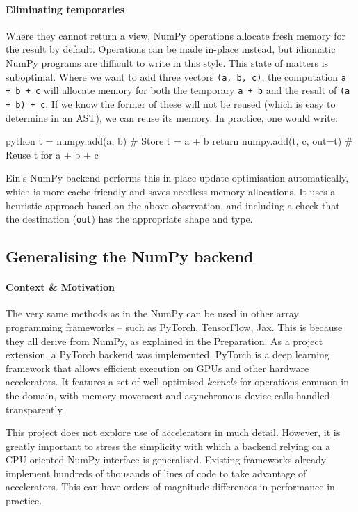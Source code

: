 \paragraph{Eliminating temporaries} Where they cannot return a view, NumPy operations allocate fresh memory for the result by default. Operations can be made in-place instead, but idiomatic NumPy programs are difficult to write in this style. 
This state of matters is suboptimal. Where we want to add three vectors \texttt{(a, b, c)}, the computation \texttt{a + b + c} will allocate memory for both the temporary \texttt{a + b} and the result of \texttt{(a + b) + c}. If we know the former of these will not be reused (which is easy to determine in an AST), we can reuse its memory. In practice, one would write:
\begin{center}
\begin{cminted}{python}
t = numpy.add(a, b)            # Store t = a + b
return numpy.add(t, c, out=t)  # Reuse t for a + b + c
\end{cminted}
\end{center}
Ein's NumPy backend performs this in-place update optimisation automatically, which is more cache-friendly and saves needless memory allocations. It uses a heuristic approach based on the above observation, and including a check that the destination (\texttt{out}) has the appropriate shape and type.

\subsection{Generalising the NumPy backend}

\paragraph{Context \& Motivation} The very same methods as in the NumPy can be used in other array programming frameworks -- such as PyTorch, TensorFlow, Jax. This is because they all derive from NumPy, as explained in the Preparation. As a project extension, a PyTorch backend was implemented. PyTorch is a deep learning framework that allows efficient execution on GPUs and other hardware accelerators. It features a set of well-optimised \textit{kernels} for operations common in the domain, with memory movement and asynchronous device calls handled transparently.

This project does not explore use of accelerators in much detail. However, it is greatly important to stress the simplicity with which a backend relying on a CPU-oriented NumPy interface is generalised. Existing frameworks already implement hundreds of thousands of lines of code to take advantage of accelerators. This can have orders of magnitude differences in performance in practice.

